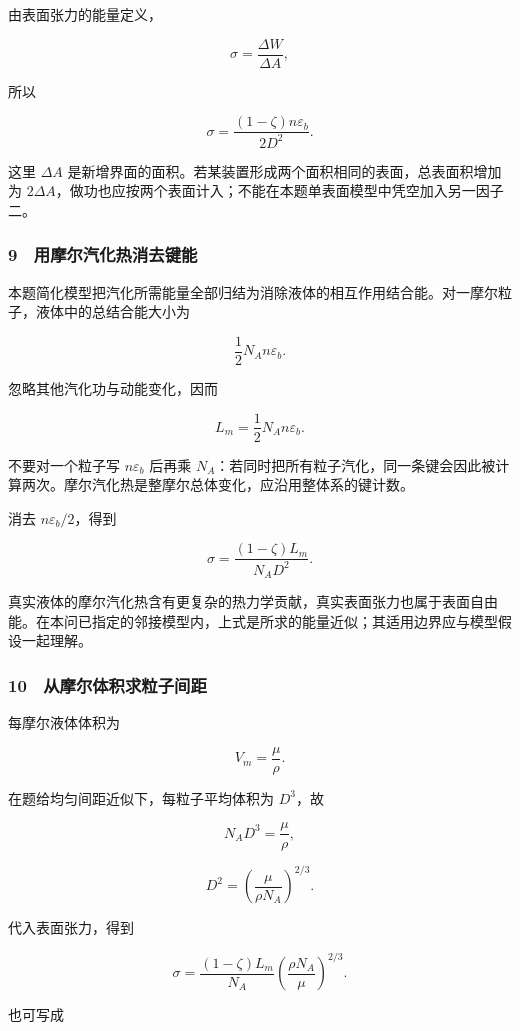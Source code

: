 \documentclass[12pt,a4paper,fontset=fandol]{ctexart}
\begin{document}
由表面张力的能量定义，

\[\sigma=\frac{\Delta W}{\Delta A},\]

所以

\[\boxed{\sigma=\frac{(1-\zeta)n\varepsilon_b}{2D^2}.}\]

这里 \(\Delta A\)
是新增界面的面积。若某装置形成两个面积相同的表面，总表面积增加为
\(2\Delta A\)，做功也应按两个表面计入；不能在本题单表面模型中凭空加入另一因子二。

\subsubsection{9　用摩尔汽化热消去键能}\label{ux7528ux6469ux5c14ux6c7dux5316ux70edux6d88ux53bbux952eux80fd}

本题简化模型把汽化所需能量全部归结为消除液体的相互作用结合能。对一摩尔粒子，液体中的总结合能大小为

\[\frac12N_An\varepsilon_b.\]

忽略其他汽化功与动能变化，因而

\[\boxed{L_m=\frac12N_An\varepsilon_b.}\]

不要对一个粒子写 \(n\varepsilon_b\) 后再乘
\(N_A\)：若同时把所有粒子汽化，同一条键会因此被计算两次。摩尔汽化热是整摩尔总体变化，应沿用整体系的键计数。

消去 \(n\varepsilon_b/2\)，得到

\[\boxed{\sigma=\frac{(1-\zeta)L_m}{N_AD^2}.}\]

真实液体的摩尔汽化热含有更复杂的热力学贡献，真实表面张力也属于表面自由能。在本问已指定的邻接模型内，上式是所求的能量近似；其适用边界应与模型假设一起理解。

\subsubsection{10　从摩尔体积求粒子间距}\label{ux4eceux6469ux5c14ux4f53ux79efux6c42ux7c92ux5b50ux95f4ux8ddd}

每摩尔液体体积为

\[V_m=\frac\mu\rho.\]

在题给均匀间距近似下，每粒子平均体积为 \(D^3\)，故

\[N_AD^3=\frac\mu\rho,\]

\[D^2=\left(\frac\mu{\rho N_A}\right)^{2/3}.\]

代入表面张力，得到

\[\boxed{\sigma=
\frac{(1-\zeta)L_m}{N_A}
\left(\frac{\rho N_A}{\mu}\right)^{2/3}.}\]

也可写成
\end{document}

